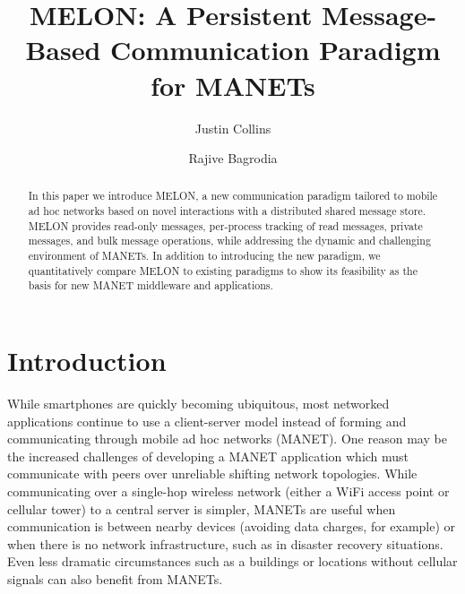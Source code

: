 \documentclass[lnicst]{svmultln}
\begin{document}
\mainmatter  %

\title{MELON: A Persistent Message-Based Communication Paradigm for MANETs}


\author{Justin Collins\and Rajive Bagrodia}




\maketitle
\begin{abstract}
In this paper we introduce MELON, a new communication paradigm tailored to mobile ad hoc networks based on novel interactions with a distributed shared message store. MELON provides read-only messages, per-process tracking of read messages, private messages, and bulk message operations, while addressing the dynamic and challenging environment of MANETs. In addition to introducing the new paradigm, we quantitatively compare MELON to existing paradigms to show its feasibility as the basis for new MANET middleware and applications.
\end{abstract}

\section{Introduction}

While smartphones are quickly becoming ubiquitous, most networked applications continue to use a client-server model instead of forming and communicating through mobile ad hoc networks (MANET). One reason may be the increased challenges of developing a MANET application which must communicate with peers over unreliable shifting network topologies. While communicating over a single-hop wireless network (either a WiFi access point or cellular tower) to a central server is simpler, MANETs are useful when communication is between nearby devices (avoiding data charges, for example) or when there is no network infrastructure, such as in disaster recovery situations. Even less dramatic circumstances such as a buildings or locations without cellular signals can also benefit from MANETs.
\end{document}
